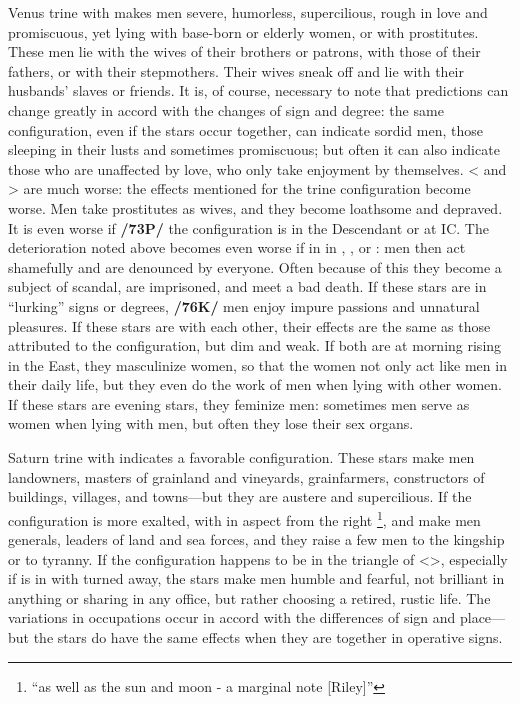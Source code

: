Venus \marginnote{\Venus \Trine \Saturn} trine with \Saturn\xspace makes men severe, humorless, supercilious, rough in love and promiscuous, yet lying with base-born or elderly women, or with prostitutes. These men lie with the wives of their brothers or patrons, with those of their fathers, or with their stepmothers. Their wives sneak off and lie with their husbands’ slaves or friends. \mndl It is, of course, necessary to note that predictions can change greatly
in accord with the changes of sign and degree: the same configuration, even if the stars occur together, can
indicate sordid men, those sleeping in their lusts and sometimes promiscuous; but often it can also indicate
those who are unaffected by love, who only take enjoyment by themselves. <\Venus\xspace and \Saturn> \Square\xspace are much worse: the effects mentioned for the trine configuration become worse. Men take prostitutes as wives, and they become loathsome and depraved. It is even worse if \textbf{/73P/} the configuration is in the Descendant or at IC. The deterioration noted above becomes even worse if \Mars\xspace in in \Conjunction, \Square, or \Opposition: men then act shamefully and are denounced by everyone. Often because of this they become a subject of scandal, are imprisoned, and meet a bad death. If these stars are in “lurking” signs or degrees,
\textbf{/76K/} men enjoy impure passions and unnatural pleasures. If these stars are \Sextile\xspace with each other, their effects are the same as those attributed to the \Trine\xspace configuration, but dim and weak. If both are at morning rising in the East, they masculinize women, so that the women not only act like men in their daily life, but
they even do the work of men when lying with other women. If these stars are evening stars, they feminize men: sometimes men serve as women when lying with men, but often they lose their sex organs.

Saturn \marginnote{\Saturn \Trine \Jupiter} trine with \Jupiter\xspace indicates a favorable configuration. These stars make men landowners, masters of grainland and vineyards, grainfarmers, constructors of buildings, villages, and towns—but they are austere and supercilious. If the configuration is more exalted, with \Mars\xspace in aspect from the right
\footnote{``as well as the sun and moon - a marginal note [Riley]''},
\Saturn\xspace and \Jupiter\xspace make men generals, leaders of land and sea forces, and they raise a few men to the
kingship or to tyranny. If the configuration happens to be in the triangle of \Saturn\xspace <\Gemini\xspace \Libra\xspace \Aquarius>, especially if \Jupiter\xspace is in \Aquarius\xspace with \Mars\xspace turned away, the stars make men humble and fearful, not brilliant in anything or sharing in any office, but rather choosing a retired, rustic life. \mndl The variations in occupations occur in accord with the differences of sign and place—but the stars do have the same effects when they are together in operative signs.

